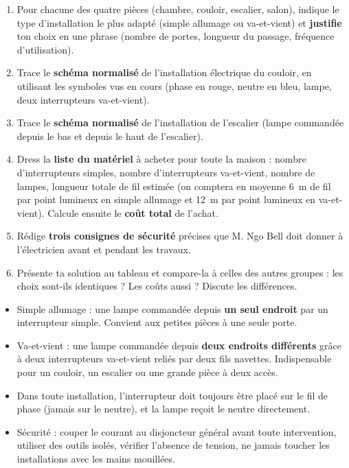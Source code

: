 \documentclass[11pt]{article}
\newcommand{\cle}[1]{{\popxbold\color{popdark}#1}}
\newcounter{popsec}
\newcounter{popsub}
\newcommand{\courssub}[1]{%
  \stepcounter{popsub}%
  \par\vspace{9pt}\noindent{\popxbold\fontsize{11.5}{13}\selectfont\color{popink}{\color{poporange}\thepopsec.\thepopsub}\hspace{6pt}#1}\par\nopagebreak\vspace{4pt}
}
\begin{document}
\begin{enumerate}
\item Pour chacune des quatre pièces (chambre, couloir, escalier, salon), indique le type d'installation le plus adapté (simple allumage ou va-et-vient) et \textbf{justifie} ton choix en une phrase (nombre de portes, longueur du passage, fréquence d'utilisation).
\item Trace le \textbf{schéma normalisé} de l'installation électrique du couloir, en utilisant les symboles vus en cours (phase en rouge, neutre en bleu, lampe, deux interrupteurs va-et-vient).
\item Trace le \textbf{schéma normalisé} de l'installation de l'escalier (lampe commandée depuis le bas et depuis le haut de l'escalier).
\item Dress la \textbf{liste du matériel} à acheter pour toute la maison : nombre d'interrupteurs simples, nombre d'interrupteurs va-et-vient, nombre de lampes, longueur totale de fil estimée (on comptera en moyenne \SI{6}{m} de fil par point lumineux en simple allumage et \SI{12}{m} par point lumineux en va-et-vient). Calcule ensuite le \textbf{coût total} de l'achat.
\item Rédige \textbf{trois consignes de sécurité} précises que M. Ngo Bell doit donner à l'électricien avant et pendant les travaux.
\item Présente ta solution au tableau et compare-la à celles des autres groupes : les choix sont-ils identiques ? Les coûts aussi ? Discute les différences.
\end{enumerate}

\courssub{Ressources à mobiliser}

\begin{aretenir}
\begin{itemize}
\item \cle{Simple allumage} : une lampe commandée depuis \textbf{un seul endroit} par un interrupteur simple. Convient aux petites pièces à une seule porte.
\item \cle{Va-et-vient} : une lampe commandée depuis \textbf{deux endroits différents} grâce à deux interrupteurs va-et-vient reliés par deux fils navettes. Indispensable pour un couloir, un escalier ou une grande pièce à deux accès.
\item Dans toute installation, l'interrupteur doit toujours être placé sur le fil de \cle{phase} (jamais sur le neutre), et la lampe reçoit le neutre directement.
\item Sécurité : couper le courant au disjoncteur général avant toute intervention, utiliser des outils isolés, vérifier l'absence de tension, ne jamais toucher les installations avec les mains mouillées.
\end{itemize}
\end{aretenir}
\end{document}
